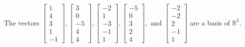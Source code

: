\begin{exercise}
\begin{exerciseStatement}
  \end{exerciseStatement}
  \begin{exerciseAnswer}
   The vectors \(\left[\begin{array}{r}
1 \\
4 \\
3 \\
1 \\
-1
\end{array}\right] , \left[\begin{array}{r}
3 \\
0 \\
-5 \\
4 \\
4
\end{array}\right] , \left[\begin{array}{r}
-2 \\
1 \\
-3 \\
-1 \\
1
\end{array}\right] , \left[\begin{array}{r}
-5 \\
0 \\
3 \\
2 \\
4
\end{array}\right] , \text{ and } \left[\begin{array}{r}
-2 \\
-2 \\
2 \\
-1 \\
1
\end{array}\right]\) 
  	 are  a basis of \(\mathbb{R}^5\).
  


  \end{exerciseAnswer}
\end{exercise}